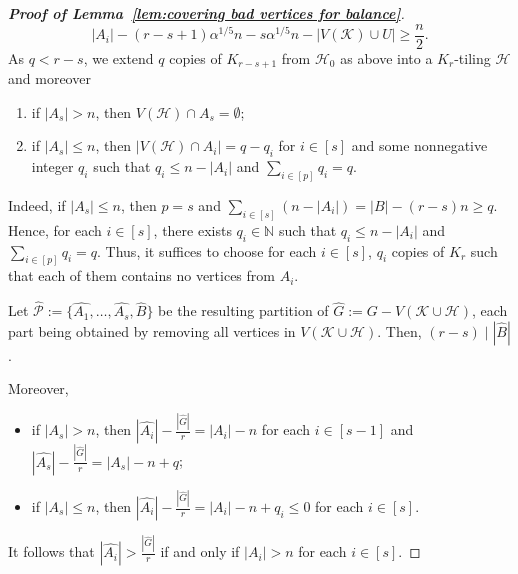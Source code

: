 \documentclass[11pt, a4paper]{article}
\theoremstyle{definition}
\newcommand{\<}{\subseteq}
\begin{document}
\begin{proof}[{\bf Proof of Lemma~\ref{lem:covering bad vertices for balance}}]
{\[
|A_i| - (r-s+1)\alpha^{1/5}n - s\alpha^{1/5}n-|V(\mathcal{K})\cup U| \ge \frac{n}{2}
.\]
}
As $q < r-s$, we extend $q$ copies of $K_{r-s+1}$ from $\mathcal{H}_0$ as above into a $K_r$-tiling $\mathcal{H}$ and moreover%
\begin{enumerate}
[label =\rm  (C\arabic{enumi})]
    \item\label{E1} if $|A_s| > n$, then $V(\mathcal{H}) \cap A_s = \emptyset$;
    \item\label{E2} if $|A_s|\leq n$, %
   then $|V(\mathcal{H}) \cap A_i| = q-q_i$ for $i\in [s]$ and some nonnegative integer $q_i$ such that $q_i\leq n-|A_i|$ and $\sum_{i\in [p]}q_i=q$.
    \end{enumerate}
Indeed, if $|A_s|\leq n$, then $p=s$ and  $\sum_{i\in [s]}(n-|A_i|)=|B|-(r-s)n\geq q$. Hence, for each $i\in [s]$, there exists $q_i\in \mathbb{N}$ such that $q_i\leq n-|A_i|$ and $\sum_{i\in [p]}q_i=q$. Thus, it suffices to choose for each $i\in [s]$,  $q_i$ copies of $K_r$ such that each of them contains no vertices from $A_i$. 



Let $\hat{\mathcal{P}}:=\{\hat{A_1},\ldots,\hat{A_s},\hat{B}\}$ be the resulting partition of $\hat{G}:=G-V(\mathcal{K}\cup \mathcal{H})$, each part being obtained by removing all vertices in $V(\mathcal{K}\cup \mathcal{H})$. Then, $(r-s)\mid |\hat{B}|$. {Moreover,
\begin{itemize}
    \item if $|A_s|>n$, then $|\hat{A_i}|-\frac{|\hat{G}|}{r}=|A_i|-n$ for each $i\in [s-1]$ and $|\hat{A_s}|-\frac{|\hat{G}|}{r}=|A_s|-n+q$;
    \item if $|A_s|\leq n$, then $|\hat{A_i}|-\frac{|\hat{G}|}{r}=|A_i|-n+q_i\leq 0$ for each $i\in [s]$. %
\end{itemize} 
It follows that $|\hat{A_i}|>\frac{|\hat{G}|}{r}$ {if and only if} $|A_i|>n$ for each $i\in [s]$.} %


\end{proof}
\end{document}
